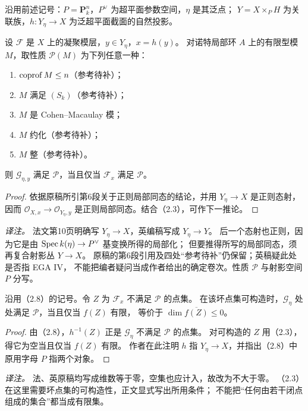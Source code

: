 \begingroup
\def\OO{\mathcal O}\def\FF{\mathcal F}\def\GG{\mathcal G}
\def\PP{\mathbf P}\def\calP{\mathcal P}\def\dd{\delta}
\def\Div{\operatorname{Div}}\def\depth{\operatorname{depth}}
\def\pr{\operatorname{pr}}\def\coker{\operatorname{coker}}
沿用前述记号：$P=\PP^n_k$，$P^\vee$ 为超平面参数空间，$\eta$ 是其泛点；
$Y=X\times_P H$ 为关联族，$h:Y_\eta\to X$ 为泛超平面截面的自然投影。


设 $\FF$ 是 $X$ 上的凝聚模层，$y\in Y_\eta$，$x=h(y)$。
对诺特局部环 $A$ 上的有限型模 $M$，取性质 $\mathcal P(M)$ 为下列任意一种：
\begin{enumerate}
 \item[(i)] $\operatorname{coprof} M\le n$（参考待补）；
 \item[(ii)] $M$ 满足 $(S_k)$（参考待补）；
 \item[(iii)] $M$ 是 Cohen--Macaulay 模；
 \item[(iv)] $M$ 约化（参考待补）；
 \item[(v)] $M$ 整（参考待补）。
\end{enumerate}
则 $\GG_{\eta,y}$ 满足 $\mathcal P$，当且仅当 $\FF_x$ 满足 $\mathcal P$。
\begin{proof}
依据原稿所引第6段关于正则局部同态的结论，并用 $Y_\eta\to X$ 是正则态射，
因而 $\OO_{X,x}\to\OO_{Y_\eta,y}$ 是正则局部同态。结合（2.3），可作下一推论。
\end{proof}
\noindent\emph{译注。} 法文第10页明确写 $Y_\eta\to X$，英编稿写成 $Y_\eta\to Y$。
后一个态射也正则，因为它是由 $\operatorname{Spec} k(\eta)\to P^\vee$ 基变换所得的局部化；
但要推得所写的局部同态，须再复合射影丛 $Y\to X$。
原稿的第6段引用及四处“参考待补”仍保留；英稿疑此处是否指 EGA IV，
不能把编者疑问当成作者给出的确定卷次。性质 $\mathcal P$ 与射影空间 $P$ 分写。

沿用（2.8）的记号。令 $Z$ 为 $\FF_x$ 不满足 $\mathcal P$ 的点集。
在该坏点集可构造时，$\GG_\eta$ 处处满足 $\mathcal P$，当且仅当 $f(Z)$ 有限，
等价于 $\dim\overline{f(Z)}\le 0$。
\begin{proof}
由（2.8），$h^{-1}(Z)$ 正是 $\GG_\eta$ 不满足 $\mathcal P$ 的点集。
对可构造的 $Z$ 用（2.3），得它为空当且仅当 $f(Z)$ 有限。
作者在此注明 $h$ 指 $Y_\eta\to X$，并指出（2.8）中原用字母 $P$ 指两个对象。
\end{proof}
\noindent\emph{译注。} 法、英原稿均写成维数等于零，空集也应计入，故改为不大于零。
（2.3）在这里需要坏点集的可构造性，正文显式写出所用条件；
不能把“任何由若干闭点组成的集合”都当成有限集。

